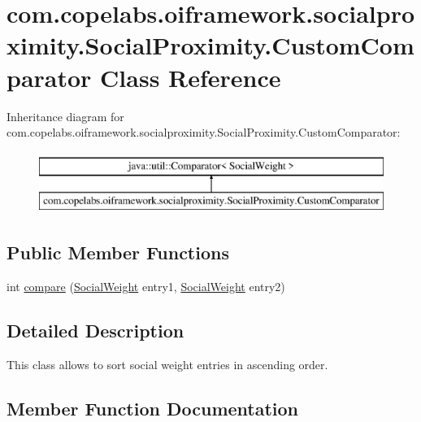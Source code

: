 \hypertarget{classcom_1_1copelabs_1_1oiframework_1_1socialproximity_1_1_social_proximity_1_1_custom_comparator}{}\section{com.\+copelabs.\+oiframework.\+socialproximity.\+Social\+Proximity.\+Custom\+Comparator Class Reference}
\label{classcom_1_1copelabs_1_1oiframework_1_1socialproximity_1_1_social_proximity_1_1_custom_comparator}
Inheritance diagram for com.\+copelabs.\+oiframework.\+socialproximity.\+Social\+Proximity.\+Custom\+Comparator\+:\begin{figure}[H]
\begin{center}
\leavevmode
\includegraphics[height=2.000000cm]{classcom_1_1copelabs_1_1oiframework_1_1socialproximity_1_1_social_proximity_1_1_custom_comparator}
\end{center}
\end{figure}
\subsection*{Public Member Functions}
\begin{DoxyCompactItemize}
\item 
int \hyperlink{classcom_1_1copelabs_1_1oiframework_1_1socialproximity_1_1_social_proximity_1_1_custom_comparator_a30b2445a2b4d3437420259a6882d30e9}{compare} (\hyperlink{classcom_1_1copelabs_1_1oiframework_1_1socialproximity_1_1_social_weight}{Social\+Weight} entry1, \hyperlink{classcom_1_1copelabs_1_1oiframework_1_1socialproximity_1_1_social_weight}{Social\+Weight} entry2)
\end{DoxyCompactItemize}


\subsection{Detailed Description}
This class allows to sort social weight entries in ascending order. 

\subsection{Member Function Documentation}
\hypertarget{classcom_1_1copelabs_1_1oiframework_1_1socialproximity_1_1_social_proximity_1_1_custom_comparator_a30b2445a2b4d3437420259a6882d30e9}{}
